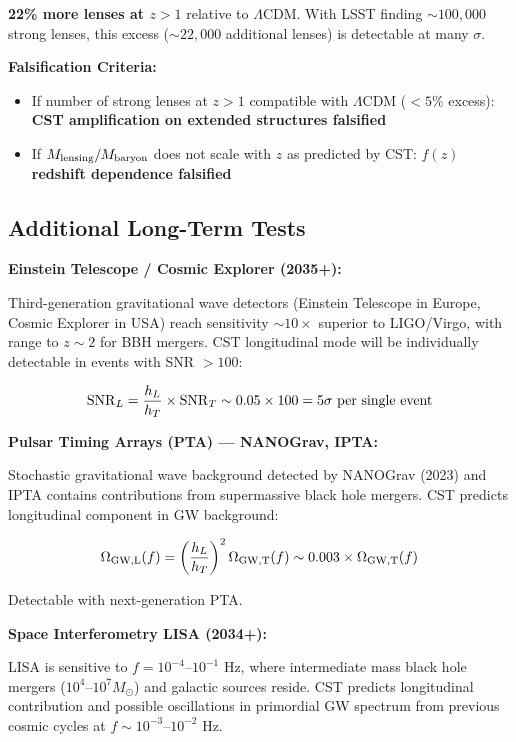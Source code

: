 \documentclass[11pt,a4paper]{article}
\providecommand{\tightlist}{\setlength{\itemsep}{0pt}\setlength{\parskip}{0pt}}
\begin{document}
\textbf{22\% more lenses at \(z > 1\)} relative to \(\Lambda\)CDM. With
LSST finding \(\sim 100,000\) strong lenses, this excess
(\(\sim 22,000\) additional lenses) is detectable at many \(\sigma\).

\textbf{Falsification Criteria:}

\begin{itemize}
\tightlist
\item
  If number of strong lenses at \(z > 1\) compatible with \(\Lambda\)CDM
  (\(< 5\%\) excess): \textbf{CST amplification on extended structures
  falsified}
\item
  If \(M_{\rm lensing}/M_{\rm baryon}\) does not scale with \(z\) as
  predicted by CST: \textbf{\(f(z)\) redshift dependence falsified}
\end{itemize}

\hypertarget{additional-long-term-tests}{%
\subsection{Additional Long-Term
Tests}\label{additional-long-term-tests}}

\textbf{Einstein Telescope / Cosmic Explorer (2035+):}

Third-generation gravitational wave detectors (Einstein Telescope in
Europe, Cosmic Explorer in USA) reach sensitivity \(\sim 10\times\)
superior to LIGO/Virgo, with range to \(z \sim 2\) for BBH mergers. CST
longitudinal mode will be individually detectable in events with SNR
\(> 100\):

\[{\rm SNR}_L = \frac{h_L}{h_T} \times {\rm SNR}_{T} \sim 0.05 \times 100 = 5\sigma~\text{per single event}\]

\textbf{Pulsar Timing Arrays (PTA) --- NANOGrav, IPTA:}

Stochastic gravitational wave background detected by NANOGrav (2023) and
IPTA contains contributions from supermassive black hole mergers. CST
predicts longitudinal component in GW background:

\[\Omega_{\rm GW,L}(f) = \left(\frac{h_L}{h_T}\right)^2 \Omega_{\rm GW,T}(f) \sim 0.003 \times \Omega_{\rm GW,T}(f)\]

Detectable with next-generation PTA.

\textbf{Space Interferometry LISA (2034+):}

LISA is sensitive to \(f = 10^{-4}\)--\(10^{-1}\) Hz, where intermediate
mass black hole mergers (\(10^4\)--\(10^7 M_\odot\)) and galactic
sources reside. CST predicts longitudinal contribution and possible
oscillations in primordial GW spectrum from previous cosmic cycles at
\(f \sim 10^{-3}\)--\(10^{-2}\) Hz.
\end{document}
